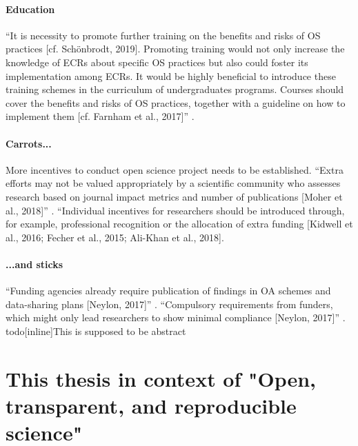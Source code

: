 \paragraph{Education}


%
``It is necessity to promote further training on the benefits and risks of OS
practices [cf. Schönbrodt, 2019].
%
Promoting training would not only increase the knowledge of ECRs about specific
OS practices but also could foster its implementation among ECRs.
%
It would be highly beneficial to introduce these training schemes in the
curriculum of undergraduates programs.
%
Courses should cover the benefits and risks of OS practices, together with a
guideline on how to implement them [cf. Farnham et al., 2017]''
\citep{toribio2021early}.


\paragraph{Carrots...}


%
More incentives to conduct open science project needs to be established.
%
``Extra efforts may not be valued appropriately by a scientific community who
assesses research based on journal impact metrics and number of publications
[Moher et al., 2018]'' \citep{toribio2021early}.
%
``Individual incentives for researchers should be introduced through, for
example, professional recognition or the allocation of extra funding [Kidwell et
al., 2016; Fecher et al., 2015; Ali-Khan et al., 2018].


\paragraph{...and sticks}

%
``Funding agencies already require publication of findings in OA
schemes and data-sharing plans [Neylon, 2017]'' \citep{toribio2021early}.
%
``Compulsory requirements from funders, which might only lead researchers to
show minimal compliance [Neylon, 2017]'' \citep{toribio2021early}.
todo[inline]{This is supposed to be abstract}


\section{This thesis in context of "Open, transparent, and reproducible
science"}

